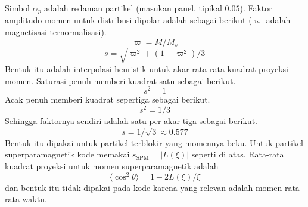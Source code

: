 \documentclass[a4paper,11pt]{article}
\begin{document}
Simbol $\alpha_{p}$ adalah redaman partikel (masukan panel, tipikal $0.05$).
Faktor amplitudo momen untuk distribusi dipolar adalah sebagai berikut
($\varpi$ adalah magnetisasi ternormalisasi).
\begin{equation*}
\varpi = M/M_{s}
\end{equation*}
\begin{equation*}
s = \sqrt{\varpi^{2}+(1-\varpi^{2})/3}
\end{equation*}
Bentuk itu adalah interpolasi heuristik untuk akar rata-rata kuadrat
proyeksi momen. Saturasi penuh memberi kuadrat satu sebagai berikut.
\begin{equation*}
s^{2} = 1
\end{equation*}
Acak penuh memberi kuadrat sepertiga sebagai berikut.
\begin{equation*}
s^{2} = 1/3
\end{equation*}
Sehingga faktornya sendiri adalah satu per akar tiga sebagai berikut.
\begin{equation*}
s = 1/\sqrt{3}\approx 0.577
\end{equation*}
Bentuk itu dipakai untuk partikel terblokir yang momennya beku.
Untuk partikel superparamagnetik kode memakai $s_{\mathrm{SPM}}=|L(\xi)|$ seperti
di atas. Rata-rata kuadrat proyeksi untuk momen superparamagnetik adalah
\begin{equation*}
\langle\cos^{2}\theta\rangle = 1-2L(\xi)/\xi
\end{equation*}
dan bentuk itu tidak dipakai pada kode karena yang relevan adalah momen
rata-rata waktu.
\end{document}
